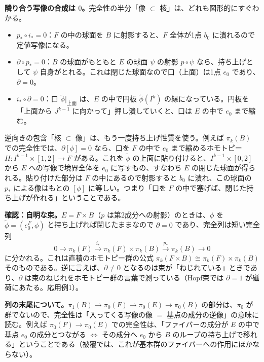 \documentclass[uplatex, dvipdfmx, book]{jsbook}
\begin{document}
\textbf{隣り合う写像の合成は $0$。}完全性の半分「像 $\subset$ 核」は、どれも図形的にすぐわかる。
\begin{itemize}
    \item $p_* \circ i_* = 0$：$F$ の中の球面を $B$ に射影すると、$F$ 全体が1点 $b_0$ に潰れるので定値写像になる。
    \item $\partial \circ p_* = 0$：$B$ の球面がもともと $E$ の球面 $\psi$ の射影 $p \circ \psi$ なら、持ち上げとして $\psi$ 自身がとれる。これは閉じた球面なので口（上面）は1点 $e_0$ であり、$\partial = 0$。
    \item $i_* \circ \partial = 0$：口 $\tilde{\phi}|_{\text{上面}}$ は、$E$ の中で円板 $\tilde{\phi}(I^k)$ の縁になっている。円板を「上面から $J^{k-1}$ に向かって」押し潰していくと、口は $E$ の中で $e_0$ まで縮む。
\end{itemize}
逆向きの包含「核 $\subset$ 像」は、もう一度持ち上げ性質を使う。例えば $\pi_k(B)$ での完全性では、$\partial[\phi] = 0$ なら、口を $F$ の中で $e_0$ まで縮めるホモトピー $H: I^{k-1} \times [1,2] \to F$ がある。これを $\tilde{\phi}$ の上面に貼り付けると、$I^{k-1} \times [0,2]$ から $E$ への写像で境界全体を $e_0$ に写すもの、すなわち $E$ の閉じた球面が得られる。貼り付けた部分は $F$ の中にあるので射影すると $b_0$ に潰れ、この球面の $p_*$ による像はもとの $[\phi]$ に等しい。つまり「口を $F$ の中で塞げば、閉じた持ち上げが作れる」ということである。

\textbf{確認：自明な束。}$E = F \times B$（$p$ は第2成分への射影）のときは、$\phi$ を $\tilde{\phi} = (e_0^{F}, \phi)$ と持ち上げれば閉じたままなので $\partial = 0$ であり、完全列は短い完全列
\begin{equation*}
    0 \to \pi_k(F) \xrightarrow{\ i_*\ } \pi_k(F) \times \pi_k(B) \xrightarrow{\ p_*\ } \pi_k(B) \to 0
\end{equation*}
に分かれる。これは直積のホモトピー群の公式 $\pi_k(F \times B) \cong \pi_k(F) \times \pi_k(B)$ そのものである。逆に言えば、$\partial \ne 0$ となるのは束が「ねじれている」ときであり、$\partial$ は束のねじれをホモトピー群の言葉で測っている（Hopf束では $\partial = 1$ が磁荷にあたる。応用例1）。

\textbf{列の末尾について。}$\pi_1(B) \to \pi_0(F) \to \pi_0(E) \to \pi_0(B)$ の部分は、$\pi_0$ が群でないので、完全性は「入ってくる写像の像 $=$ 基点の成分の逆像」の意味に読む。例えば $\pi_0(F) \to \pi_0(E)$ での完全性は、「ファイバーの成分が $E$ の中で基点 $e_0$ の成分とつながる $\iff$ その成分へ $e_0$ から $B$ のループの持ち上げで移れる」ということである（被覆では、これが基本群のファイバーへの作用にほかならない）。
\end{document}
